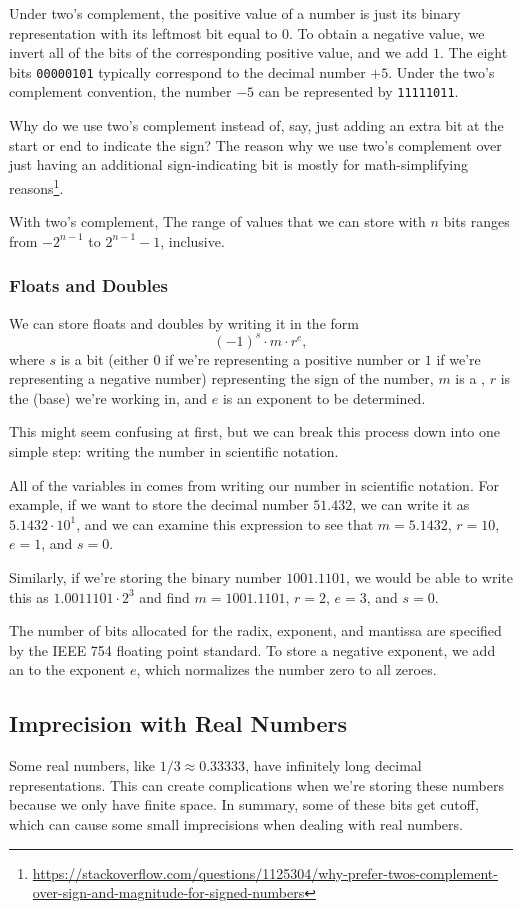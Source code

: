 Under two's complement, the positive value of a number is just its binary representation with its leftmost bit equal to $0$. To obtain a negative value, we invert all of the bits of the corresponding positive value, and we add $1$. The eight bits \verb!00000101! typically correspond to the decimal number $+5$. Under the two's complement convention, the number $-5$ can be represented by \verb!11111011!.

Why do we use two's complement instead of, say, just adding an extra bit at the start or end to indicate the sign? The reason why we use two's complement over just having an additional sign-indicating bit is mostly for math-simplifying reasons\footnote{\url{https://stackoverflow.com/questions/1125304/why-prefer-twos-complement-over-sign-and-magnitude-for-signed-numbers}}. 


With two's complement, The range of values that we can store with $n$ bits ranges from $-2^{n - 1}$ to $2^{n - 1} - 1$, inclusive.

\subsubsection{Floats and Doubles}
We can store floats and doubles by writing it in the form \begin{equation}
\label{fp:rep}
(-1)^{s} \cdot m \cdot r^{e},
\end{equation}
where $s$ is a bit (either $0$ if we're representing a positive number or $1$ if we're representing a negative number) representing the sign of the number, $m$ is a , $r$ is the  (base) we're working in, and $e$ is an exponent to be determined.   


This might seem confusing at first, but we can break this process down into one simple step: writing the number in scientific notation.


All of the variables in  comes from writing our number in scientific notation. For example, if we want to store the decimal number $51.432$, we can write it as $5.1432 \cdot 10^{1}$, and we can examine this expression to see that $m = 5.1432$, $r = 10$, $e = 1$, and $s = 0$.  

Similarly, if we're storing the binary number $1001.1101$, we would be able to write this as $1.0011101 \cdot 2^{3}$ and find $m = 1001.1101$, $r = 2$, $e = 3$, and $s = 0$. 


The number of bits allocated for the radix, exponent, and mantissa are specified by the IEEE 754 floating point standard. To store a negative exponent, we add an  to the exponent $e$, which normalizes the number zero to all zeroes. 


\subsection{Imprecision with Real Numbers}

Some real numbers, like $1/3 \approx 0.33333$, have infinitely long decimal representations. This can create complications when we're storing these numbers because we only have finite space. In summary, some of these bits get cutoff, which can cause some small imprecisions when dealing with real numbers. 